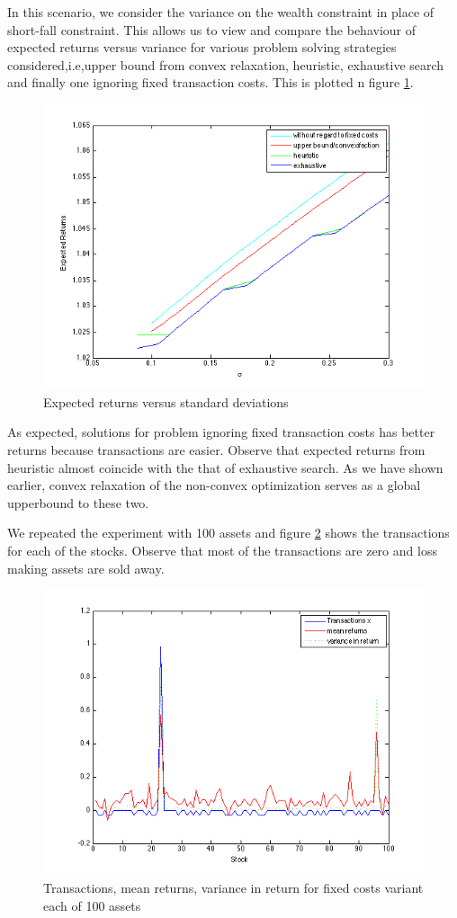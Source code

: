 \documentclass[a4paper]{article}
\begin{document}
In this scenario, we consider the variance on the wealth constraint in place of short-fall constraint. 
This allows us to view and compare the behaviour of expected returns versus variance for various problem solving strategies considered,i.e,upper bound from convex relaxation, heuristic, exhaustive search and finally one ignoring fixed transaction costs. This is plotted n figure \ref{fig:3}. 

\begin{figure}
\centering
\includegraphics[width=5in]{mu_v_sigma_n=4_fixed.png}
\caption{Expected returns versus standard deviations}
\label{fig:3}
\end{figure}

As expected, solutions for problem ignoring fixed transaction costs has better returns because  transactions are easier. 
Observe that expected returns from heuristic almost coincide with the that of exhaustive search.
As we have shown earlier, convex relaxation of the non-convex optimization serves as a global upperbound to these two.

We repeated the experiment with 100 assets and figure \ref{fig:4} shows the transactions for each of the stocks. 
Observe that most of the transactions are zero and loss making assets are sold away.
\begin{figure}[h]
\centering
\includegraphics[width=5in]{stock_vis2.png}
\caption{Transactions, mean returns, variance in return for fixed costs variant each of 100 assets}
\label{fig:4}
\end{figure}
\end{document}
